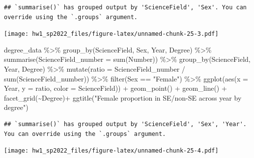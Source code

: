 \documentclass[
]{article}
\newenvironment{Shaded}{\begin{snugshade}}{\end{snugshade}}
\newcommand{\AttributeTok}[1]{\textcolor[rgb]{0.77,0.63,0.00}{#1}}
\newcommand{\FunctionTok}[1]{\textcolor[rgb]{0.00,0.00,0.00}{#1}}
\newcommand{\NormalTok}[1]{#1}
\newcommand{\SpecialCharTok}[1]{\textcolor[rgb]{0.00,0.00,0.00}{#1}}
\newcommand{\StringTok}[1]{\textcolor[rgb]{0.31,0.60,0.02}{#1}}
\begin{document}
\begin{verbatim}
## `summarise()` has grouped output by 'ScienceField', 'Sex'. You can override using the `.groups` argument.
\end{verbatim}

\texttt{[image: hw1\_sp2022\_files/figure-latex/unnamed-chunk-25-3.pdf]}

\begin{Shaded}
\begin{Highlighting}[]
\NormalTok{degree\_data }\SpecialCharTok{\%\textgreater{}\%}
  \FunctionTok{group\_by}\NormalTok{(ScienceField, Sex, Year, Degree) }\SpecialCharTok{\%\textgreater{}\%}
  \FunctionTok{summarise}\NormalTok{(}\AttributeTok{ScienceField\_number =} \FunctionTok{sum}\NormalTok{(Number)) }\SpecialCharTok{\%\textgreater{}\%}
  \FunctionTok{group\_by}\NormalTok{(ScienceField, Year, Degree) }\SpecialCharTok{\%\textgreater{}\%}
  \FunctionTok{mutate}\NormalTok{(}\AttributeTok{ratio =}\NormalTok{ ScienceField\_number }\SpecialCharTok{/} \FunctionTok{sum}\NormalTok{(ScienceField\_number)) }\SpecialCharTok{\%\textgreater{}\%}
  \FunctionTok{filter}\NormalTok{(Sex }\SpecialCharTok{==} \StringTok{"Female"}\NormalTok{) }\SpecialCharTok{\%\textgreater{}\%}
  \FunctionTok{ggplot}\NormalTok{(}\FunctionTok{aes}\NormalTok{(}\AttributeTok{x =}\NormalTok{ Year, }\AttributeTok{y =}\NormalTok{ ratio, }\AttributeTok{color =}\NormalTok{ ScienceField)) }\SpecialCharTok{+}
  \FunctionTok{geom\_point}\NormalTok{() }\SpecialCharTok{+} \FunctionTok{geom\_line}\NormalTok{() }\SpecialCharTok{+}
  \FunctionTok{facet\_grid}\NormalTok{(}\SpecialCharTok{\textasciitilde{}}\NormalTok{Degree)}\SpecialCharTok{+}
  \FunctionTok{ggtitle}\NormalTok{(}\StringTok{"Female proportion in SE/non{-}SE across year by degree"}\NormalTok{)}
\end{Highlighting}
\end{Shaded}

\begin{verbatim}
## `summarise()` has grouped output by 'ScienceField', 'Sex', 'Year'. You can override using the `.groups` argument.
\end{verbatim}

\texttt{[image: hw1\_sp2022\_files/figure-latex/unnamed-chunk-25-4.pdf]}
\end{document}
